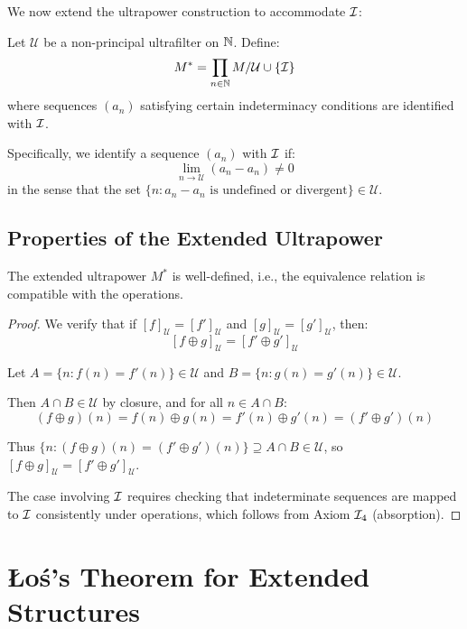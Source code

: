 We now extend the ultrapower construction to accommodate $\mathcal{I}$:

\begin{definition}
\label{def:extended-ultrapower}
Let $\mathcal{U}$ be a non-principal ultrafilter on $\mathbb{N}$. Define:
\[
M^* = \prod_{n \in \mathbb{N}} M / \mathcal{U} \cup \{\mathcal{I}\}
\]
where sequences $(a_n)$ satisfying certain indeterminacy conditions are identified with $\mathcal{I}$.
\end{definition}

Specifically, we identify a sequence $(a_n)$ with $\mathcal{I}$ if:
\[
\lim_{n \to \mathcal{U}} (a_n - a_n) \neq 0
\]
in the sense that the set $\{n : a_n - a_n \text{ is undefined or divergent}\} \in \mathcal{U}$.

\subsection{Properties of the Extended Ultrapower}

\begin{theorem}
The extended ultrapower $M^*$ is well-defined, i.e., the equivalence relation is compatible with the operations.
\end{theorem}

\begin{proof}
We verify that if $[f]_{\mathcal{U}} = [f']_{\mathcal{U}}$ and $[g]_{\mathcal{U}} = [g']_{\mathcal{U}}$, then:
\[
[f \oplus g]_{\mathcal{U}} = [f' \oplus g']_{\mathcal{U}}
\]

Let $A = \{n : f(n) = f'(n)\} \in \mathcal{U}$ and $B = \{n : g(n) = g'(n)\} \in \mathcal{U}$.

Then $A \cap B \in \mathcal{U}$ by closure, and for all $n \in A \cap B$:
\[
(f \oplus g)(n) = f(n) \oplus g(n) = f'(n) \oplus g'(n) = (f' \oplus g')(n)
\]

Thus $\{n : (f \oplus g)(n) = (f' \oplus g')(n)\} \supseteq A \cap B \in \mathcal{U}$, so $[f \oplus g]_{\mathcal{U}} = [f' \oplus g']_{\mathcal{U}}$.

The case involving $\mathcal{I}$ requires checking that indeterminate sequences are mapped to $\mathcal{I}$ consistently under operations, which follows from Axiom $\mathcal{I}_4$ (absorption).
\end{proof}

\section{Łoś's Theorem for Extended Structures}

